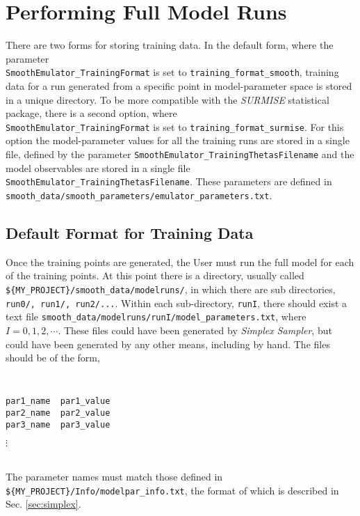 \documentclass[UserManual.tex]{subfiles}
\begin{document}
\setcounter{section}{3}
\section{Performing Full Model Runs}\label{sec:fullmodel}

There are two forms for storing training data. In the default form, where the parameter\\
{\tt SmoothEmulator\_TrainingFormat} is set to {\tt training\_format\_smooth}, training data for a run generated from a specific point in model-parameter space is stored in a unique directory. To be more compatible with the {\it SURMISE} statistical package, there is a second option, where\\
{\tt SmoothEmulator\_TrainingFormat} is set to {\tt training\_format\_surmise}. For this option the model-parameter values for all the training runs are stored in a single file, defined by the parameter {\tt SmoothEmulator\_TrainingThetasFilename} and the model observables are stored in a single file {\tt SmoothEmulator\_TrainingThetasFilename}. These parameters are defined in\\
{\tt smooth\_data/smooth\_parameters/emulator\_parameters.txt}. 

\subsection{Default Format for Training Data}

Once the training points are generated, the User must run the full model for each of the training points. At this point there is a directory, usually called {\tt \$\{MY\_PROJECT\}/smooth\_data/modelruns/}, in which there are sub directories, {\tt run0/, run1/, run2/...}.  Within each sub-directory, {\tt runI}, there should exist a text file {\tt smooth\_data/modelruns/runI/model\_parameters.txt}, where $I=0,1,2,\cdots$. These files could have been generated by {\it Simplex Sampler}, but could have been generated by any other means, including by hand. The files should be of the form,
{\tt
\begin{verbatim}
par1_name  par1_value
par2_name  par2_value
par3_name  par3_value
\end{verbatim}\vspace*{-20pt}\hspace*{24pt}$\vdots$
}\\
The parameter names must match those defined in {\tt \$\{MY\_PROJECT\}/Info/modelpar\_info.txt}, the format of which is described in Sec. \ref{sec:simplex}. 
\end{document}
